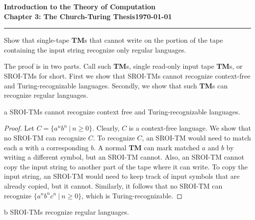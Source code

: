 \documentclass[11pt]{article}
\newcommand{\dated}{\today}
\begin{document}
\textbf{Introduction to the Theory of
Computation}\hfill\textbf{\myname}\\[0.01in]
\textbf{Chapter 3: The Church-Turing Thesis}\hfill\textbf{\dated}\\
\smallskip\hrule\bigskip

\begin{problem}{3.20}
Show that single-tape \textbf{TM}s that cannot write on the portion of the tape containing the input string recognize only regular languages.
\end{problem}

The proof is in two parts. Call such \textbf{TM}s, single read-only input tape \textbf{TM}s, or  SROI-TMs for short. First we show that SROI-TMs cannot recognize context-free and Turing-recognizable languages. Secondly, we show that such \textbf{TM}s can recognize regular languages.

\begin{problem}[Part]{a}
SROI-TMs cannot recognize context free and Turing-recognizable languages. 
\end{problem}

\begin{proof}
Let $C = \{a^nb^n \ | \ n \geq 0 \}$. Clearly, $C$ is a context-free language. We show that no SROI-TM can recognize $C$. To recognize $C$, an SROI-TM would need to match each $a$ with a corresponding $b$. A normal \textbf{TM} can mark matched $a$ and $b$ by writing a different symbol, but an SROI-TM cannot. Also, an SROI-TM cannot copy the input string to another part of the tape where it can write. To copy the input string, an SROI-TM would need to keep track of input symbols that are already copied, but it cannot. Similarly, it follows that no SROI-TM can recognize $\{a^nb^nc^n \ | \ n \geq 0 \}$, which is Turing-recognizable.
\end{proof}

\begin{problem}[Part]{b}
SROI-TMs recognize regular languages.
\end{problem}
\end{document}
